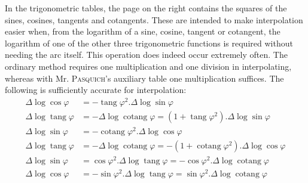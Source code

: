 In the trigonometric tables, the page on the right contains the squares of the sines, cosines, tangents and cotangents. These are intended to make interpolation easier when, from the logarithm of a sine, cosine, tangent or cotangent, the logarithm of one of the other three trigonometric functions is required without needing the arc itself. This operation does indeed occur extremely often. The ordinary method requires one multiplication and one division in interpolating, whereas with Mr. \textsc{Pasquich}'s auxiliary table one multiplication suffices. The following is sufficiently accurate for interpolation:
\[
\begin{aligned}
\Delta\log\cos\varphi&=-\operatorname{tang}\varphi^{2}.\Delta\log\sin\varphi\\
\Delta\log\operatorname{tang}\varphi&=-\Delta\log\operatorname{cotang}\varphi=(1+\operatorname{tang}\varphi^{2}).\Delta\log\sin\varphi\\
\Delta\log\sin\varphi&=-\operatorname{cotang}\varphi^{2}.\Delta\log\cos\varphi\\
\Delta\log\operatorname{tang}\varphi&=-\Delta\log\operatorname{cotang}\varphi=-(1+\operatorname{cotang}\varphi^{2}).\Delta\log\cos\varphi\\
\Delta\log\sin\varphi&=\cos\varphi^{2}.\Delta\log\operatorname{tang}\varphi=-\cos\varphi^{2}.\Delta\log\operatorname{cotang}\varphi\\
\Delta\log\cos\varphi&=-\sin\varphi^{2}.\Delta\log\operatorname{tang}\varphi=\sin\varphi^{2}.\Delta\log\operatorname{cotang}\varphi
\end{aligned}
\]
